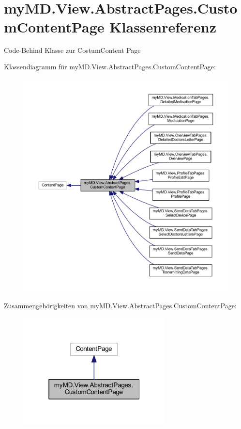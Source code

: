 \hypertarget{classmy_m_d_1_1_view_1_1_abstract_pages_1_1_custom_content_page}{}\section{my\+M\+D.\+View.\+Abstract\+Pages.\+Custom\+Content\+Page Klassenreferenz}
\label{classmy_m_d_1_1_view_1_1_abstract_pages_1_1_custom_content_page}


Code-\/\+Behind Klasse zur Costum\+Content Page  




Klassendiagramm für my\+M\+D.\+View.\+Abstract\+Pages.\+Custom\+Content\+Page\+:
\nopagebreak
\begin{figure}[H]
\begin{center}
\leavevmode
\includegraphics[width=350pt]{classmy_m_d_1_1_view_1_1_abstract_pages_1_1_custom_content_page__inherit__graph}
\end{center}
\end{figure}


Zusammengehörigkeiten von my\+M\+D.\+View.\+Abstract\+Pages.\+Custom\+Content\+Page\+:\nopagebreak
\begin{figure}[H]
\begin{center}
\leavevmode
\includegraphics[width=220pt]{classmy_m_d_1_1_view_1_1_abstract_pages_1_1_custom_content_page__coll__graph}
\end{center}
\end{figure}
